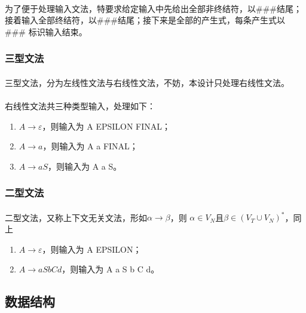 \documentclass[UTF8]{ctexart}
\begin{document}
	\paragraph{} %
	为了便于处理输入文法，特要求给定输入中先给出全部非终结符，以$\#\#\#$结尾；
	接着输入全部终结符，以$\#\#\#$结尾；接下来是全部的产生式，每条产生式以$\#\#\#$
	标识输入结束。
	\subsubsection{三型文法} %
	\paragraph{} %
	三型文法，分为左线性文法与右线性文法，不妨，本设计只处理右线性文法。
	\paragraph{} %
	右线性文法共三种类型输入，处理如下：
	\begin{enumerate}
		\item $A \rightarrow \varepsilon$，则输入为 A EPSILON FINAL；
		\item $A \rightarrow a$，则输入为 A a FINAL；
		\item $A \rightarrow aS$，则输入为 A a S。
	\end{enumerate}
	\subsubsection{二型文法} %
	\paragraph{} %
	二型文法，又称上下文无关文法，形如$\alpha \rightarrow \beta$，则
	$\alpha \in V_N$且$\beta \in (V_T \cup V_N)^*$，同上
	\begin{enumerate}
		\item $A \rightarrow \varepsilon$，则输入为 A EPSILON；
		\item $A \rightarrow aSbCd$，则输入为 A a S b C d。
	\end{enumerate}
	\subsection{数据结构} %
	\label{sub:data_structure}
\end{document}
